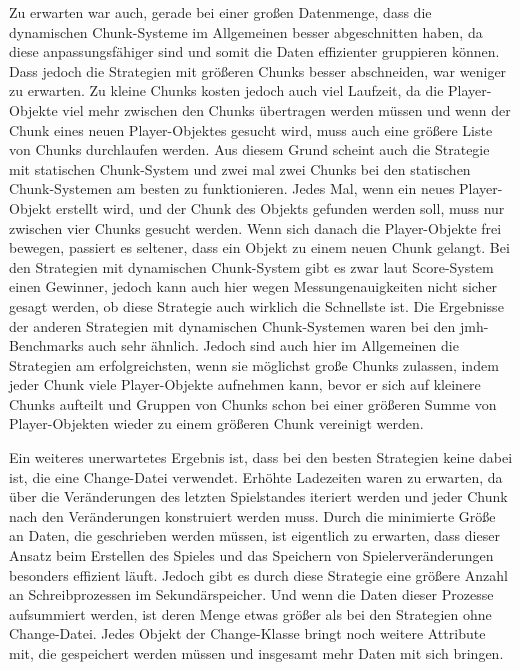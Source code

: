 Zu erwarten war auch, gerade bei einer großen Datenmenge, dass die dynamischen Chunk-Systeme im Allgemeinen besser abgeschnitten haben, da diese anpassungsfähiger sind und somit die Daten effizienter gruppieren können. Dass jedoch die Strategien mit größeren Chunks besser abschneiden, war weniger zu erwarten. Zu kleine Chunks kosten jedoch auch viel Laufzeit, da die Player-Objekte viel mehr zwischen den Chunks übertragen werden müssen und wenn der Chunk eines neuen Player-Objektes gesucht wird, muss auch eine größere Liste von Chunks durchlaufen werden. Aus diesem Grund scheint auch die Strategie mit statischen Chunk-System und zwei mal zwei Chunks bei den statischen Chunk-Systemen am besten zu funktionieren. Jedes Mal, wenn ein neues Player-Objekt erstellt wird, und der Chunk des Objekts gefunden werden soll, muss nur zwischen vier Chunks gesucht werden. Wenn sich danach die Player-Objekte frei bewegen, passiert es seltener, dass ein Objekt zu einem neuen Chunk gelangt. Bei den Strategien mit dynamischen Chunk-System gibt es zwar laut Score-System einen Gewinner, jedoch kann auch hier wegen Messungenauigkeiten nicht sicher gesagt werden, ob diese Strategie auch wirklich die Schnellste ist. Die Ergebnisse der anderen Strategien mit dynamischen Chunk-Systemen waren bei den \ac{jmh}-Benchmarks auch sehr ähnlich. Jedoch sind auch hier im Allgemeinen die Strategien am erfolgreichsten, wenn sie möglichst große Chunks zulassen, indem jeder Chunk viele Player-Objekte aufnehmen kann, bevor er sich auf kleinere Chunks aufteilt und Gruppen von Chunks schon bei einer größeren Summe von Player-Objekten wieder zu einem größeren Chunk vereinigt werden.

Ein weiteres unerwartetes Ergebnis ist, dass bei den besten Strategien keine dabei ist, die eine Change-Datei verwendet. Erhöhte Ladezeiten waren zu erwarten, da über die Veränderungen des letzten Spielstandes iteriert werden und jeder Chunk nach den Veränderungen konstruiert werden muss. Durch die minimierte Größe an Daten, die geschrieben werden müssen, ist eigentlich zu erwarten, dass dieser Ansatz beim Erstellen des Spieles und das Speichern von Spielerveränderungen besonders effizient läuft. Jedoch gibt es durch diese Strategie eine größere Anzahl an Schreibprozessen im Sekundärspeicher. Und wenn die Daten dieser Prozesse aufsummiert werden, ist deren Menge etwas größer als bei den Strategien ohne Change-Datei. Jedes Objekt der Change-Klasse bringt noch weitere Attribute mit, die gespeichert werden müssen und insgesamt mehr Daten mit sich bringen.

